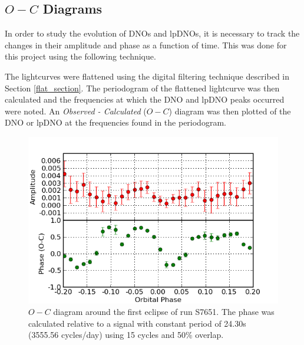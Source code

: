 


\subsection{$O-C$ Diagrams}

\label{ominc_section}

In order to study the evolution of DNOs and lpDNOs, it is necessary to track the changes in their amplitude and phase as a function of time. This was done for this project using the following technique.

The lightcurves were flattened using the digital filtering technique described in Section \ref{flat_section}. The periodogram of the flattened lightcurve was then calculated and the frequencies at which the DNO and lpDNO peaks occurred were noted. An \textit{Observed - Calculated} ($O-C$) diagram was then plotted of the DNO or lpDNO at the frequencies found in the periodogram.


\begin{figure}
 \centering
 \includegraphics[width = 0.8\columnwidth, bb=0 0 600 400]{images/august_phot/S7651/S7651_24.30.png}
 \caption[$O-C$ diagram around the first eclipse of run S7651.]{$O-C$ diagram around the first eclipse of run S7651. The phase was calculated relative to a signal with constant period of 24.30s (3555.56 cycles/day) using 15 cycles and 50\% overlap.  }
 \label{OC_example}
\end{figure}

